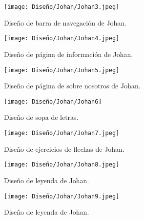 \begin{figure}[ht!]
  \centering 
  \texttt{[image: Diseño/Johan/Johan3.jpeg]}
  \caption{Diseño de barra de navegación de Johan.}
  \label{Johan3}
\end{figure}

\begin{figure}[ht!]
  \centering
  \texttt{[image: Diseño/Johan/Johan4.jpeg]}
  \caption{Diseño de página de información de Johan.}
  \label{Johan4}
\end{figure}

\begin{figure}[ht!]
  \centering
  \texttt{[image: Diseño/Johan/Johan5.jpeg]}
  \caption{Diseño de página de sobre nosotros de Johan.}
  \label{Johan5}
\end{figure}

\begin{figure}[ht!]
  \centering
  \texttt{[image: Diseño/Johan/Johan6]}
  \caption{Diseño de sopa de letras.}
  \label{Johan6}
\end{figure}

\begin{figure}[ht!]
  \centering
  \texttt{[image: Diseño/Johan/Johan7.jpeg]}
  \caption{Diseño de ejercicios de flechas de Johan.}
  \label{Johan7}
\end{figure} 

\begin{figure}[ht!]
  \centering
  \texttt{[image: Diseño/Johan/Johan8.jpeg]}
  \caption{Diseño de leyenda de Johan.}
  \label{Johan8}
\end{figure}

\begin{figure}[ht!]
  \centering
  \texttt{[image: Diseño/Johan/Johan9.jpeg]}
  \caption{Diseño de leyenda de Johan.}
  \label{Johan9}
\end{figure}